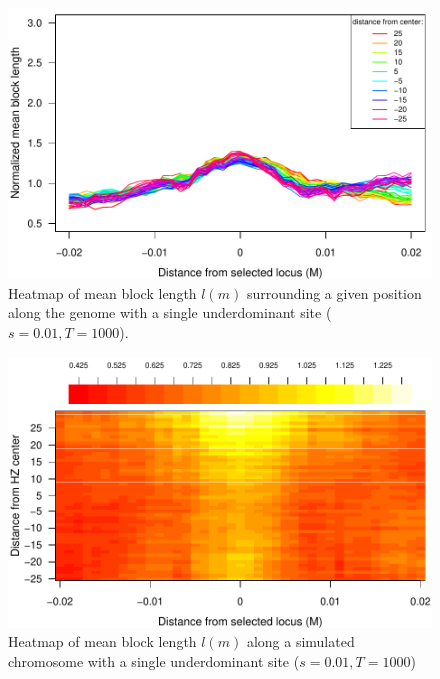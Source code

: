 \begin{figure}
\includegraphics{figs/blocksAlongChromNoConditioning.pdf}
\caption{Heatmap of mean block length $l(m)$ surrounding a given position along the genome with a single underdominant site ($s=0.01, T=1000$). }\label{Supp:blockLengthNoAnc}
\end{figure}

\begin{figure}
\includegraphics{figs/blocksAlongChromHeatmap.pdf}
\caption{Heatmap of mean block length $l(m)$ along a simulated chromosome with a single underdominant site ($s=0.01, T=1000$) }\label{Supp:blockLengthHeatmapNoAnc}
\end{figure}


